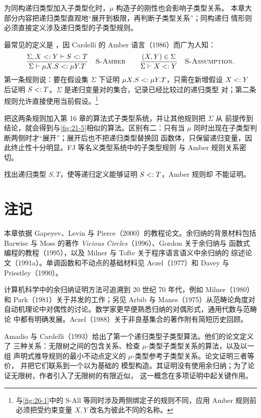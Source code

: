 为同构递归类型加入子类型化时，\(\mu\) 构造子的刚性也会影响子类型关系。
本章大部分内容把递归类型直观地“展开到极限，再判断子类型关系”；同构递归
情形则必须直接定义涉及递归类型的子类型规则。

最常见的定义是 ，因 Cardelli 的 Amber
语言（1986）而广为人知：
\[
\frac{\Sigma,X\mathrel{<:} Y\vdash S\mathrel{<:} T}
     {\Sigma\vdash\mu X.S\mathrel{<:}\mu Y.T}
\quad\textsc{S-Amber}
\qquad
\frac{(X,Y)\in\Sigma}{\Sigma\vdash X\mathrel{<:} Y}
\quad\textsc{S-Assumption}.
\]
第一条规则说：要在假设集 \(\Sigma\) 下证明
\(\mu X.S\mathrel{<:}\mu Y.T\)，只需在新增假设 \(X\mathrel{<:} Y\) 后证明
\(S\mathrel{<:} T\)。\(\Sigma\) 是递归变量对的集合，记录已经比较过的递归类型
对；第二条规则允许直接使用当前假设。\footnote{与\cref{fig:26-1}中的 S-All
等同时涉及两侧绑定子的规则不同，应用 Amber 规则前必须把受约束变量 \(X,Y\)
改名为彼此不同的名称。}

把这两条规则加入第 16 章的算法式子类型系统，并让其他规则把 \(\Sigma\) 从
前提传到结论，就会得到与\cref{fig:21-5}相似的算法。区别有二：只有当
\(\mu\) 同时出现在子类型判断两侧时才“展开”；展开后也不把递归类型替换回
函数体，只保留递归变量，因此终止性十分明显。FJ 等名义类型系统中的子类型规则
与 Amber 规则关系密切。

\begin{exercise}
\label{ex:21.11.1}
找出递归类型 \(S,T\)，使等递归定义能够证明 \(S\mathrel{<:} T\)，Amber 规则却
不能证明。
\end{exercise}

\section{注记}
\label{sec:21.12}

本章依据 Gapeyev、Levin 与 Pierce（2000）的教程论文。余归纳的背景材料包括
Barwise 与 Moss 的著作 \emph{Vicious Circles}（1996）、Gordon 关于余归纳与
函数式编程的教程（1995），以及 Milner 与 Tofte 关于程序语言语义中余归纳的
综述论文（1991a）。单调函数和不动点的基础材料见 Aczel（1977）和 Davey 与
Priestley（1990）。

计算机科学中的余归纳证明方法可追溯到 20 世纪 70 年代，例如 Milner（1980）
和 Park（1981）关于并发的工作；另见 Arbib 与 Manes（1975）从范畴论角度对
自动机理论中对偶性的讨论。数学家更早便熟悉归纳的对偶形式，通用代数与范畴论
中都有明确发展。Aczel（1988）关于非良基集合的著作附有简短历史回顾。

Amadio 与 Cardelli（1993）给出了第一个递归类型子类型算法。他们的论文定义了
三种关系：无限树之间的包含关系、检查 \(\mu\)-类型子类型关系的算法，以及以一组
声明式推导规则的最小不动点定义的 \(\mu\)-类型参考子类型关系。论文证明三者等价，
并把它们联系到一个以为基础的
模型构造。其证明没有使用余归纳；为了论证无限树，作者引入了无限树的有限近似，
这一概念在多项证明中起关键作用。

